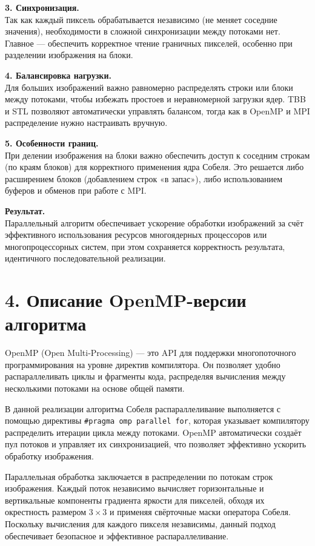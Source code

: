 \documentclass{report}
\begin{document}
\textbf{3. Синхронизация.} \\
Так как каждый пиксель обрабатывается независимо (не меняет соседние значения), необходимости в сложной синхронизации между потоками нет. Главное — обеспечить корректное чтение граничных пикселей, особенно при разделении изображения на блоки.

\textbf{4. Балансировка нагрузки.} \\
Для больших изображений важно равномерно распределять строки или блоки между потоками, чтобы избежать простоев и неравномерной загрузки ядер. TBB и STL позволяют автоматически управлять балансом, тогда как в OpenMP и MPI распределение нужно настраивать вручную.

\textbf{5. Особенности границ.} \\
При делении изображения на блоки важно обеспечить доступ к соседним строкам (по краям блоков) для корректного применения ядра Собеля. Это решается либо расширением блоков (добавлением строк «в запас»), либо использованием буферов и обменов при работе с MPI.

\textbf{Результат.} \\
Параллельный алгоритм обеспечивает ускорение обработки изображений за счёт эффективного использования ресурсов многоядерных процессоров или многопроцессорных систем, при этом сохраняется корректность результата, идентичного последовательной реализации.

\newpage
\section*{4. Описание OpenMP-версии алгоритма}

OpenMP (Open Multi-Processing) — это API для поддержки многопоточного программирования на уровне директив компилятора. Он позволяет удобно распараллеливать циклы и фрагменты кода, распределяя вычисления между несколькими потоками на основе общей памяти.

В данной реализации алгоритма Собеля распараллеливание выполняется с помощью директивы \texttt{\#pragma omp parallel for}, которая указывает компилятору распределить итерации цикла между потоками. OpenMP автоматически создаёт пул потоков и управляет их синхронизацией, что позволяет эффективно ускорить обработку изображения.

Параллельная обработка заключается в распределении по потокам строк изображения. Каждый поток независимо вычисляет горизонтальные и вертикальные компоненты градиента яркости для пикселей, обходя их окрестность размером \(3 \times 3\) и применяя свёрточные маски оператора Собеля. Поскольку вычисления для каждого пикселя независимы, данный подход обеспечивает безопасное и эффективное распараллеливание.
\end{document}
